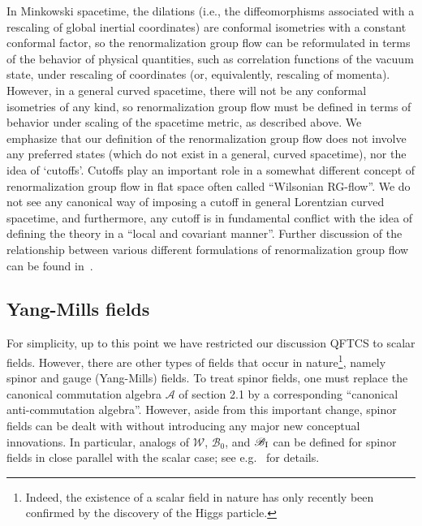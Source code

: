 \documentclass[12pt]{article}
\newcommand{\rI}{{\rm I}}
\newcommand{\eA}{\mathscr{A}}
\newcommand{\eB}{\mathscr{B}}
\newcommand{\eW}{\mathscr{W}}
\theoremstyle{plain}
\theoremstyle{definition}
\begin{document}
In Minkowski spacetime, the dilations (i.e., the diffeomorphisms associated with a rescaling of global inertial coordinates) are conformal isometries with a constant conformal factor, so the renormalization group flow can be
reformulated in terms of the behavior of physical quantities, such as correlation functions of the vacuum state, under rescaling of coordinates (or, equivalently, rescaling of momenta). However, in a general curved spacetime, there
will not be any conformal isometries of any kind, so renormalization group flow must be defined in terms of behavior
under scaling of the spacetime metric, as described above. 
We emphasize that our definition of the renormalization group flow does not involve any preferred states 
(which do not exist in a general, curved spacetime), nor the idea of `cutoffs'. Cutoffs play an important role in a somewhat different concept 
of renormalization group flow in flat space often called ``Wilsonian RG-flow''. We do not see any canonical way of imposing a cutoff in 
general Lorentzian curved spacetime, and furthermore, any cutoff is in fundamental conflict with the idea of defining the theory 
in a ``local and covariant manner''. Further discussion of the relationship between various different formulations of renormalization group flow can be found in~\cite{bdf}.





\subsection{Yang-Mills fields}
\label{sec4}

For simplicity, up to this point we have restricted our discussion QFTCS to scalar fields. However, there are other types of fields that occur in nature\footnote{Indeed, the existence of a scalar field in nature has only recently been confirmed by the discovery of the Higgs particle.}, namely spinor and gauge (Yang-Mills) fields. To treat spinor fields, one must replace the canonical commutation algebra $\eA$ of section 2.1 by a corresponding ``canonical anti-commutation algebra''. However, aside from this important change, spinor fields can be dealt
with without introducing any major new conceptual innovations. In particular, analogs of $\eW$, $\eB_0$, and $\eB_\rI$ can be defined for spinor fields in close parallel with the scalar case; see e.g.~\cite{extended} for details.
\end{document}
